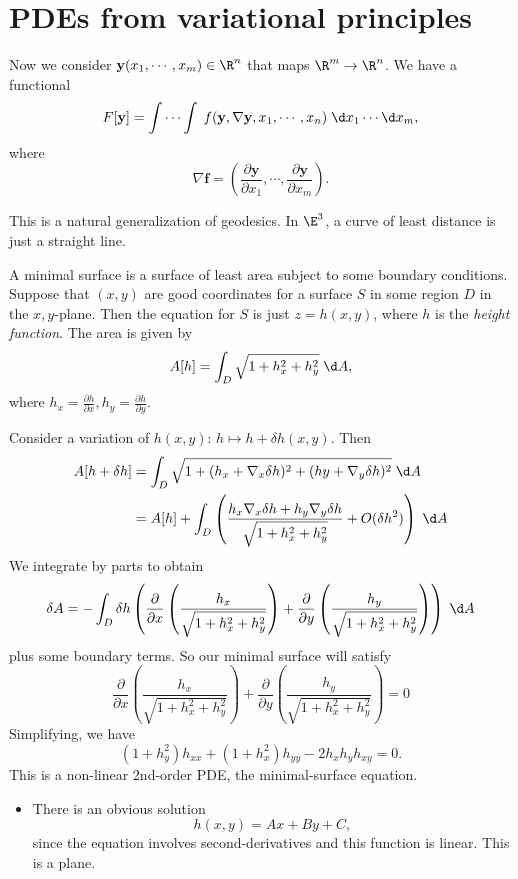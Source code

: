 \documentclass[a4paper]{article}
\begin{document}
\section{PDEs from variational principles}
Now we consider $\mathbf{y}(x_1, \cdots, x_m) \in \R^n$ that maps $\R^m \to \R^n$. We have a functional
\[
  F[\mathbf{y}] = \int\cdots \int \; f(\mathbf{y}, \nabla \mathbf{y}, x_1, \cdots, x_n)\;\d x_1\cdots \d x_m,
\]
where
\[
  \nabla \mathbf{f} = \left(\frac{\partial \mathbf{y}}{\partial x_1}, \cdots, \frac{\partial \mathbf{y}}{\partial x_m}\right).
\]
\begin{eg}
  This is a natural generalization of geodesics. In $\E^3$, a curve of least distance is just a straight line.

  A minimal surface is a surface of least area subject to some boundary conditions. Suppose that $(x, y)$ are good coordinates for a surface $S$ in some region $D$ in the $x,y$-plane. Then the equation for $S$ is just $z = h(x, y)$, where $h$ is the \emph{height function}. The area is given by
  \[
    A[h] = \int_D \sqrt{1 + h_x^2 + h_y^2}\;\d A,
  \]
  where $h_x = \frac{\partial h}{\partial x}, h_y = \frac{\partial h}{\partial y}$.

  Consider a variation of $h(x, y)$: $h\mapsto h + \delta h(x, y)$. Then
  \begin{align*}
    A[h + \delta h] &= \int_D \sqrt{1 + (h_x + \nabla_x \delta h)^2 + (hy + \nabla_y \delta h)^2}\;\d A\\
    &= A[h] + \int_D \left(\frac{h_x \nabla_x \delta h + h_y \nabla_y \delta h}{\sqrt{1 + h_x^2 + h_y^2}} + O(\delta h^2)\right)\;\d A
  \end{align*}
  We integrate by parts to obtain
  \[
    \delta A = -\int_D \delta h\left(\frac{\partial}{\partial x} \left(\frac{h_x}{\sqrt{1 + h_x^2 + h_y^2}}\right) + \frac{\partial}{\partial y} \left(\frac{h_y}{\sqrt{1 + h_x^2 + h_y^2}}\right)\right)\;\d A
  \]
  plus some boundary terms. So our minimal surface will satisfy
  \[
    \frac{\partial}{\partial x} \left(\frac{h_x}{\sqrt{1 + h_x^2 + h_y^2}}\right) + \frac{\partial}{\partial y} \left(\frac{h_y}{\sqrt{1 + h_x^2 + h_y^2}}\right) = 0
  \]
  Simplifying, we have
  \[
    (1 + h_y^2)h_{xx} + (1 + h_x^2) h_{yy} - 2h_xh_y h_{xy} = 0.
  \]
  This is a non-linear 2nd-order PDE, the minimal-surface equation.
  \begin{itemize}
    \item There is an obvious solution
      \[
        h(x, y) = Ax + By + C,
      \]
      since the equation involves second-derivatives and this function is linear. This is a plane.


\end{itemize}
\end{eg}
\end{document}

